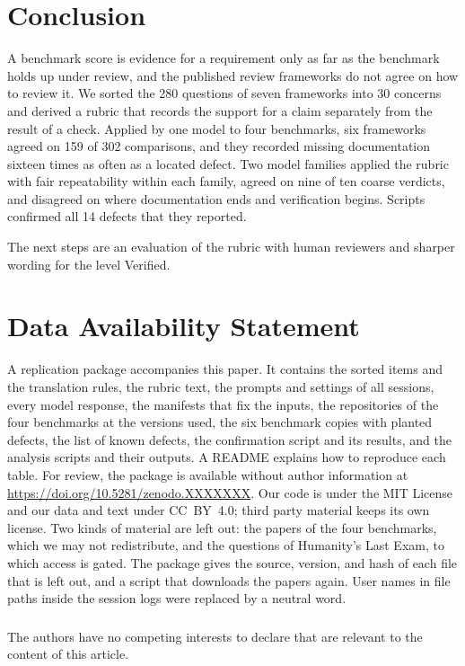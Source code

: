 \documentclass[runningheads]{llncs}
\begin{document}
\section{Conclusion}
\label{sec:conclusion}

A benchmark score is evidence for a requirement only as far as the benchmark holds up under review, and the published review frameworks do not agree on how to review it. We sorted the 280 questions of seven frameworks into 30 concerns and derived a rubric that records the support for a claim separately from the result of a check. Applied by one model to four benchmarks, six frameworks agreed on 159 of 302 comparisons, and they recorded missing documentation sixteen times as often as a located defect. Two model families applied the rubric with fair repeatability within each family, agreed on nine of ten coarse verdicts, and disagreed on where documentation ends and verification begins. Scripts confirmed all 14 defects that they reported.

The next steps are an evaluation of the rubric with human reviewers and sharper wording for the level Verified.

\section*{Data Availability Statement}
A replication package accompanies this paper. It contains the sorted items and the translation rules, the rubric text, the prompts and settings of all sessions, every model response, the manifests that fix the inputs, the repositories of the four benchmarks at the versions used, the six benchmark copies with planted defects, the list of known defects, the confirmation script and its results, and the analysis scripts and their outputs. A README explains how to reproduce each table. For review, the package is available without author information at \url{https://doi.org/10.5281/zenodo.XXXXXXX}. Our code is under the MIT License and our data and text under CC~BY~4.0; third party material keeps its own license. Two kinds of material are left out: the papers of the four benchmarks, which we may not redistribute, and the questions of Humanity's Last Exam, to which access is gated. The package gives the source, version, and hash of each file that is left out, and a script that downloads the papers again. User names in file paths inside the session logs were replaced by a neutral word.

\begin{credits}
\subsubsection{\discintname}
The authors have no competing interests to declare that are relevant to the content of this article.
\end{credits}
\end{document}
